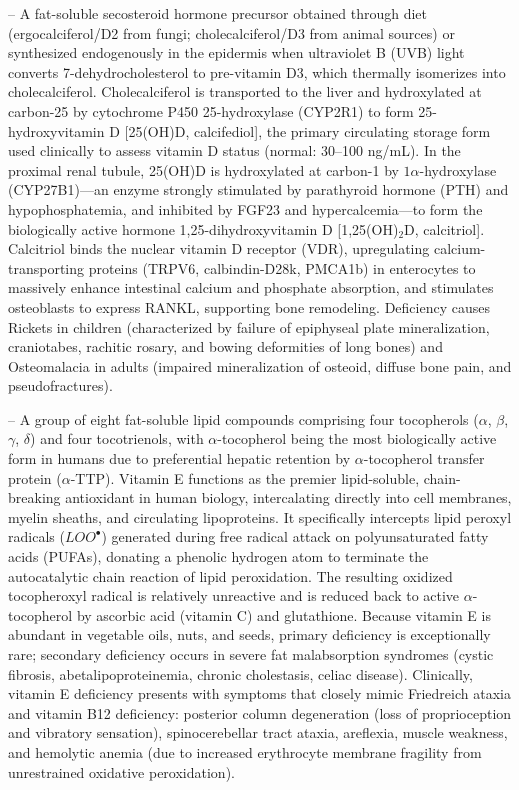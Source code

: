 -- A fat-soluble secosteroid hormone precursor obtained through diet (ergocalciferol/D2 from fungi; cholecalciferol/D3 from animal sources) or synthesized endogenously in the epidermis when ultraviolet B (UVB) light converts 7-dehydrocholesterol to pre-vitamin D3, which thermally isomerizes into cholecalciferol. Cholecalciferol is transported to the liver and hydroxylated at carbon-25 by cytochrome P450 25-hydroxylase (CYP2R1) to form 25-hydroxyvitamin D [25(OH)D, calcifediol], the primary circulating storage form used clinically to assess vitamin D status (normal: 30--100 ng/mL). In the proximal renal tubule, 25(OH)D is hydroxylated at carbon-1 by $1\alpha$-hydroxylase (CYP27B1)---an enzyme strongly stimulated by parathyroid hormone (PTH) and hypophosphatemia, and inhibited by FGF23 and hypercalcemia---to form the biologically active hormone 1,25-dihydroxyvitamin D [1,25(OH)$_2$D, calcitriol]. Calcitriol binds the nuclear vitamin D receptor (VDR), upregulating calcium-transporting proteins (TRPV6, calbindin-D28k, PMCA1b) in enterocytes to massively enhance intestinal calcium and phosphate absorption, and stimulates osteoblasts to express RANKL, supporting bone remodeling. Deficiency causes Rickets in children (characterized by failure of epiphyseal plate mineralization, craniotabes, rachitic rosary, and bowing deformities of long bones) and Osteomalacia in adults (impaired mineralization of osteoid, diffuse bone pain, and pseudofractures).

-- A group of eight fat-soluble lipid compounds comprising four tocopherols ($\alpha$, $\beta$, $\gamma$, $\delta$) and four tocotrienols, with $\alpha$-tocopherol being the most biologically active form in humans due to preferential hepatic retention by $\alpha$-tocopherol transfer protein ($\alpha$-TTP). Vitamin E functions as the premier lipid-soluble, chain-breaking antioxidant in human biology, intercalating directly into cell membranes, myelin sheaths, and circulating lipoproteins. It specifically intercepts lipid peroxyl radicals ($LOO^\bullet$) generated during free radical attack on polyunsaturated fatty acids (PUFAs), donating a phenolic hydrogen atom to terminate the autocatalytic chain reaction of lipid peroxidation. The resulting oxidized tocopheroxyl radical is relatively unreactive and is reduced back to active $\alpha$-tocopherol by ascorbic acid (vitamin C) and glutathione. Because vitamin E is abundant in vegetable oils, nuts, and seeds, primary deficiency is exceptionally rare; secondary deficiency occurs in severe fat malabsorption syndromes (cystic fibrosis, abetalipoproteinemia, chronic cholestasis, celiac disease). Clinically, vitamin E deficiency presents with symptoms that closely mimic Friedreich ataxia and vitamin B12 deficiency: posterior column degeneration (loss of proprioception and vibratory sensation), spinocerebellar tract ataxia, areflexia, muscle weakness, and hemolytic anemia (due to increased erythrocyte membrane fragility from unrestrained oxidative peroxidation).


